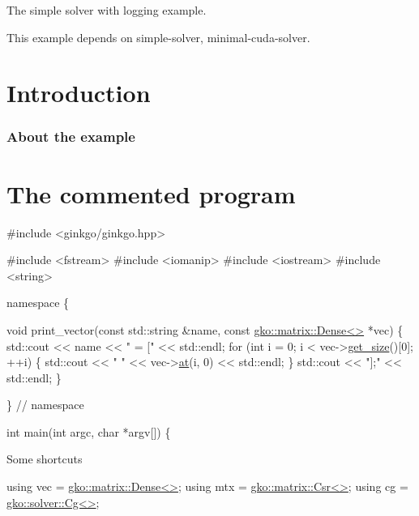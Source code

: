 The simple solver with logging example.

This example depends on simple-\/solver, minimal-\/cuda-\/solver.

 \label{_Intro}%
 \label{_Introduction}%
\section*{Introduction}

\label{_Abouttheexample}%
\subsubsection*{About the example }

\label{_CommProg}%
 \section*{The commented program}


\begin{DoxyCode}
\textcolor{preprocessor}{#include <ginkgo/ginkgo.hpp>}


\textcolor{preprocessor}{#include <fstream>}
\textcolor{preprocessor}{#include <iomanip>}
\textcolor{preprocessor}{#include <iostream>}
\textcolor{preprocessor}{#include <string>}


\textcolor{keyword}{namespace }\{


\textcolor{keywordtype}{void} print\_vector(\textcolor{keyword}{const} std::string &name, \textcolor{keyword}{const} \hyperlink{classgko_1_1matrix_1_1Dense}{gko::matrix::Dense<>} *vec)
\{
    std::cout << name << \textcolor{stringliteral}{" = ["} << std::endl;
    \textcolor{keywordflow}{for} (\textcolor{keywordtype}{int} i = 0; i < vec->\hyperlink{classgko_1_1LinOp_a31b3c003388eb0b95393154f68c2b98d}{get\_size}()[0]; ++i) \{
        std::cout << \textcolor{stringliteral}{"    "} << vec->\hyperlink{classgko_1_1matrix_1_1Dense_af0f1af68853537807ca271a296de3cd0}{at}(i, 0) << std::endl;
    \}
    std::cout << \textcolor{stringliteral}{"];"} << std::endl;
\}


\}  \textcolor{comment}{// namespace}


\textcolor{keywordtype}{int} main(\textcolor{keywordtype}{int} argc, \textcolor{keywordtype}{char} *argv[])
\{
\end{DoxyCode}


Some shortcuts


\begin{DoxyCode}
\textcolor{keyword}{using} vec = \hyperlink{classgko_1_1matrix_1_1Dense}{gko::matrix::Dense<>};
\textcolor{keyword}{using} mtx = \hyperlink{classgko_1_1matrix_1_1Csr}{gko::matrix::Csr<>};
\textcolor{keyword}{using} cg = \hyperlink{classgko_1_1solver_1_1Cg}{gko::solver::Cg<>};
\end{DoxyCode}



